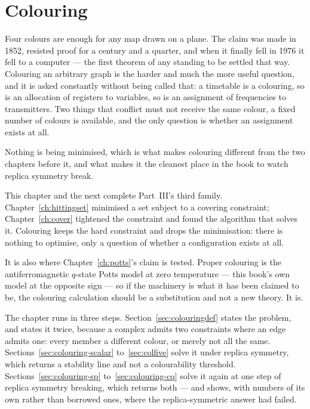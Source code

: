 \chapter{Colouring}
\label{ch:colouring}

Four colours are enough for any map drawn on a plane. The claim was made in
1852, resisted proof for a century and a quarter, and when it finally fell in
1976 it fell to a computer --- the first theorem of any standing to be settled
that way. Colouring an arbitrary graph is the harder and much the more useful
question, and it is asked constantly without being called that: a timetable is a
colouring, so is an allocation of registers to variables, so is an assignment of
frequencies to transmitters. Two things that conflict must not receive the same
colour, a fixed number of colours is available, and the only question is whether
an assignment exists at all.

Nothing is being minimised, which is what makes colouring different from the two
chapters before it, and what makes it the cleanest place in the book to watch
replica symmetry break.

This chapter and the next complete Part~III's third family.
Chapter~\ref{ch:hittingset}
minimised a set subject to a covering constraint; Chapter~\ref{ch:cover}
tightened the constraint and found the algorithm that solves it. Colouring
keeps the hard constraint and drops the minimisation: there is nothing to
optimise, only a question of whether a configuration exists at all.

It is also where Chapter~\ref{ch:potts}'s claim is tested. Proper colouring is
the antiferromagnetic $q$-state Potts model at zero temperature --- this book's
own model at the opposite sign --- so if the machinery is what it has been
claimed to be, the colouring calculation should be a substitution and not a new
theory. It is.

The chapter runs in three steps. Section~\ref{sec:colouringdef} states the
problem, and states it twice, because a complex admits two constraints where an
edge admits one: every member a different colour, or merely not all the same.
Sections~\ref{sec:colouring-scalar} to~\ref{sec:colfive} solve it under
replica symmetry, which returns a stability line and not a colourability
threshold. Sections~\ref{sec:colouring-sp} to~\ref{sec:colouring-cq} solve it
again at one step of replica symmetry breaking, which returns both --- and
shows, with numbers of its own rather than borrowed ones, where the
replica-symmetric answer had failed.

